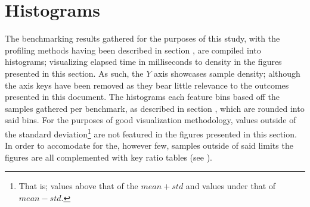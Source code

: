 \section{Histograms}
\label{sec:histograms}
The benchmarking results gathered for the purposes of this study, with the profiling methods having been described in section , are compiled into histograms; visualizing elapsed time in milliseconds to density in the figures presented in this section.
As such, the $Y$ axis showcases sample density; although the axis keys have been removed as they bear little relevance to the outcomes presented in this document.
The histograms each feature  bins based off the  samples gathered per benchmark, as described in section , which are rounded into said bins.
For the purposes of good visualization methodology, values outside of the standard deviation\footnote{That is; values above that of the $mean + std$ and values under that of $mean - std$.} are not featured in the figures presented in this section.
In order to accomodate for the, however few, samples outside of said limits the figures are all complemented with key ratio tables (see  ).